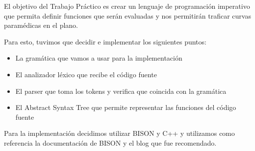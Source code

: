 El objetivo del Trabajo Práctico es crear un lenguaje de programación imperativo que permita definir funciones que serán evaluadas y nos permitirán traficar curvas paramédicas en el plano. 

Para esto, tuvimos que decidir e implementar los siguientes puntos:
\begin{itemize}
\item La gramática que vamos a usar para la implementación
\item El analizador léxico que recibe el código fuente
\item El parser que toma los tokens y verifica que coincida con la gramática
\item El Abstract Syntax Tree que permite representar las funciones del código fuente
\end{itemize}
Para la implementación decidimos utilizar BISON y C++ y utilizamos como referencia la documentación de BISON y el blog que fue recomendado.
